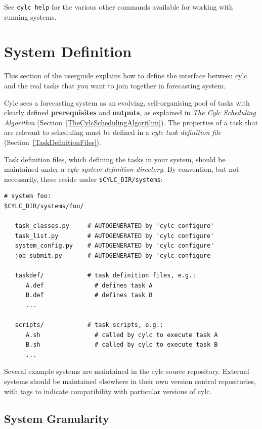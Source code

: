 \documentclass[11pt,a4paper]{article}
\begin{document}
See \lstinline=cylc help= for the various other commands available for
working with running systems.


\pagebreak
\section{System Definition} 
\label{SystemDefinition}

This section of the userguide explains how to define the interface
between cylc and the real tasks that you want to join together in
forecasting system.

Cylc sees a forecasting system as an evolving, self-organising pool of
tasks with clearly defined {\bf prerequisites} and {\bf outputs}, as
explained in {\em The Cylc Scheduling Algorithm}
(Section~\ref{TheCylcSchedulingAlgorithm}). The properties of a task
that are relevant to scheduling must be defined in a {\em cylc task
definition file} (Section~\ref{TaskDefinitionFiles}). 

Task definition files, which defining the tasks in your system, should
be maintained under a {\em cylc system definition directory}. By
convention, but not necessarily, these reside under
\lstinline=$CYLC_DIR/systems=: 

\lstset{language=bash}

\begin{lstlisting}
# system foo:
$CYLC_DIR/systems/foo/

   task_classes.py     # AUTOGENERATED by 'cylc configure' 
   task_list.py        # AUTOGENERATED by 'cylc configure' 
   system_config.py    # AUTOGENERATED by 'cylc configure' 
   job_submit.py       # AUTOGENERATED by 'cylc configure

   taskdef/            # task definition files, e.g.:
      A.def              # defines task A
      B.def              # defines task B
      ...

   scripts/            # task scripts, e.g.:
      A.sh               # called by cylc to execute task A
      B.sh               # called by cylc to execute task B
      ...
\end{lstlisting}

Several example systems are maintained in the cylc source repository.
External systems should be maintained elsewhere in their own version
control repositories, with tags to indicate compatibility with
particular versions of cylc.

\subsection{System Granularity} 
\label{System Granularity}
\end{document}
